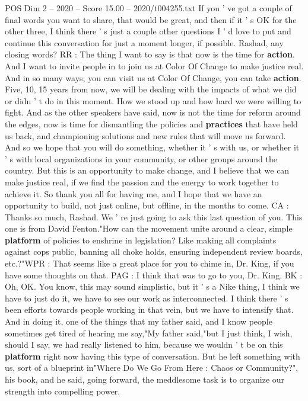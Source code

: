 \begin{textsample}{POS Dim 2 – 2020 – Score 15.00 – 2020/t004255.txt}
If you ' ve got a couple of final words you want to share, that would be great, and then if it ' s OK for the other three, I think there ' s just a couple other questions I ' d love to put and continue this conversation for just a moment longer, if possible.
Rashad, any closing words?
RR : The thing I want to say is that now is the time for \textbf{action}.
And I want to invite people in to join us at Color Of Change to make justice real.
And in so many ways, you can visit us at Color Of Change, you can take \textbf{action}.
Five, 10, 15 years from now, we will be dealing with the impacts of what we did or didn ' t do in this moment.
How we stood up and how hard we were willing to fight.
And as the other speakers have said, now is not the time for reform around the edges, now is time for dismantling the policies and \textbf{practices} that have held us back, and championing solutions and new rules that will move us forward.
And so we hope that you will do something, whether it ' s with us, or whether it ' s with local organizations in your community, or other groups around the country.
But this is an opportunity to make change, and I believe that we can make justice real, if we find the passion and the energy to work together to achieve it.
So thank you all for having me, and I hope that we have an opportunity to build, not just online, but offline, in the months to come.
CA : Thanks so much, Rashad.
We ' re just going to ask this last question of you.
This one is from David Fenton."How can the movement unite around a clear, simple \textbf{platform} of policies to enshrine in legislation?
Like making all complaints against cops public, banning all choke holds, ensuring independent review boards, etc.?"WPR : That seems like a great place for you to chime in, Dr.
King, if you have some thoughts on that.
PAG : I think that was to go to you, Dr.
King.
BK : Oh, OK.
You know, this may sound simplistic, but it ' s a Nike thing, I think we have to just do it, we have to see our work as interconnected.
I think there ' s been efforts towards people working in that vein, but we have to intensify that.
And in doing it, one of the things that my father said, and I know people sometimes get tired of hearing me say,"My father said,"but I just think, I wish, should I say, we had really listened to him, because we wouldn ' t be on this \textbf{platform} right now having this type of conversation.
But he left something with us, sort of a blueprint in"Where Do We Go From Here : Chaos or Community?", his book, and he said, going forward, the meddlesome task is to organize our strength into compelling power.

\end{textsample}
